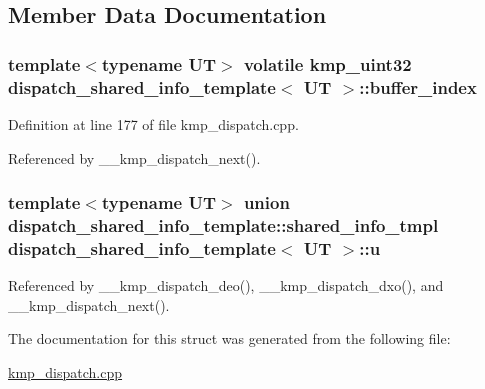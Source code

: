 \subsection{Member Data Documentation}
\hypertarget{structdispatch__shared__info__template_adbb52e9b93edf55cee184b9b44a6e77a}{
\subsubsection[{buffer\-\_\-index}]{\setlength{\rightskip}{0pt plus 5cm}template$<$typename U\-T$>$ volatile kmp\-\_\-uint32 {\bf dispatch\-\_\-shared\-\_\-info\-\_\-template}$<$ U\-T $>$\-::buffer\-\_\-index}}\label{structdispatch__shared__info__template_adbb52e9b93edf55cee184b9b44a6e77a}


Definition at line 177 of file kmp\-\_\-dispatch.\-cpp.



Referenced by \-\_\-\-\_\-kmp\-\_\-dispatch\-\_\-next().

\hypertarget{structdispatch__shared__info__template_addc37a0a7602f461c2be5840b5fbea23}{
\subsubsection[{u}]{\setlength{\rightskip}{0pt plus 5cm}template$<$typename U\-T$>$ union {\bf dispatch\-\_\-shared\-\_\-info\-\_\-template\-::shared\-\_\-info\-\_\-tmpl}  {\bf dispatch\-\_\-shared\-\_\-info\-\_\-template}$<$ U\-T $>$\-::u}}\label{structdispatch__shared__info__template_addc37a0a7602f461c2be5840b5fbea23}


Referenced by \-\_\-\-\_\-kmp\-\_\-dispatch\-\_\-deo(), \-\_\-\-\_\-kmp\-\_\-dispatch\-\_\-dxo(), and \-\_\-\-\_\-kmp\-\_\-dispatch\-\_\-next().



The documentation for this struct was generated from the following file\-:\begin{DoxyCompactItemize}
\item 
\hyperlink{kmp__dispatch_8cpp}{kmp\-\_\-dispatch.\-cpp}\end{DoxyCompactItemize}
